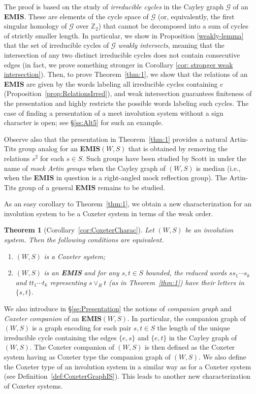 \documentclass[A4paper, oneside]{amsart}
\newcommand{\Z}{\mathbb{Z}}
\newcommand{\id}{\textit{e}}
\newcommand{\G}{\mathcal{G}}
\newcommand{\EMIS}{\textnormal{\bf EMIS}\xspace}
\newtheorem{thm}{Theorem}[section]
\theoremstyle{definition}
\begin{document}
The proof is based on the study of {\em irreducible cycles} in the Cayley graph $\G$ of an \EMIS. These are elements of the cycle space of $\G$ (or, equivalently, the first singular homology of $\G$ over $\Z_2$) that cannot be decomposed into a sum of cycles of strictly smaller length. In particular, we show in Proposition \ref{weakly-lemma} that the set of irreducible cycles of $\G$ \emph{weakly intersects}, meaning that the intersection of any two distinct irreducible cycles does not contain consecutive edges (in fact, we prove something stronger in Corollary \ref{cor: stronger weak intersection}). Then, to prove Theorem~\ref{thm:1}, we show that the relations of an \EMIS are given by the words labeling all irreducible cycles containing $\id$ (Proposition~\ref{prop:RelationsIrred}), and weak intersection guarantees finiteness of the presentation and highly restricts the possible words labeling such cycles. The case of finding a presentation of a meet involution system without a sign character is open; see \S\ref{ss:Alt5} for such an example.

Observe also that the presentation in Theorem~\ref{thm:1} provides a natural  Artin-Tits group analog for an \EMIS $(W,S)$ that is obtained by removing the relations $s^2$ for each $s \in S$. Such groups have been studied by Scott in \cite{RAMRG} under the name of \emph{mock Artin groups} when the Cayley graph of $(W,S)$ is median (i.e., when the \EMIS in question is a right-angled mock reflection group). The Artin-Tits group of a general \EMIS remains to be studied.

As an easy corollary to Theorem~\ref{thm:1}, we obtain a new characterization for an involution system to be a Coxeter system in terms of the weak order.

\begin{thm}[Corollary~\ref{cor:CoxeterCharac}]
	Let $(W,S)$ be an involution system. Then the following conditions are equivalent.
	\begin{enumerate}
		\item $(W,S)$ is a Coxeter system;
		\item $(W,S)$ is an \EMIS and for any $s,t\in S$ bounded, the reduced words $ss_1 \cdots s_k$ and $tt_1 \cdots t_k$ representing $s \vee_R t$ (as in Theorem~\ref{thm:1}) have their letters in $\{s,t\}$.
	\end{enumerate}
\end{thm}

We also introduce in \S\ref{se:Presentation} the notions of \emph{companion graph} and \emph{Coxeter companion} of an \EMIS $(W,S)$. In particular, the companion graph of $(W,S)$ is a graph encoding for each pair $s,t \in S$ the length of the unique irreducible cycle containing the edges $\{\id,s\}$ and $\{\id,t\}$ in the Cayley graph of $(W,S)$. The Coxeter companion of $(W,S)$ is then defined as the Coxeter system having as Coxeter type the companion graph of $(W,S)$. We also define the Coxeter type of an involution system in a similar way as for a Coxeter system (see Definition~\ref{def:CoxeterGraphIS}). This leads to another new characterization of Coxeter systems.
\end{document}
